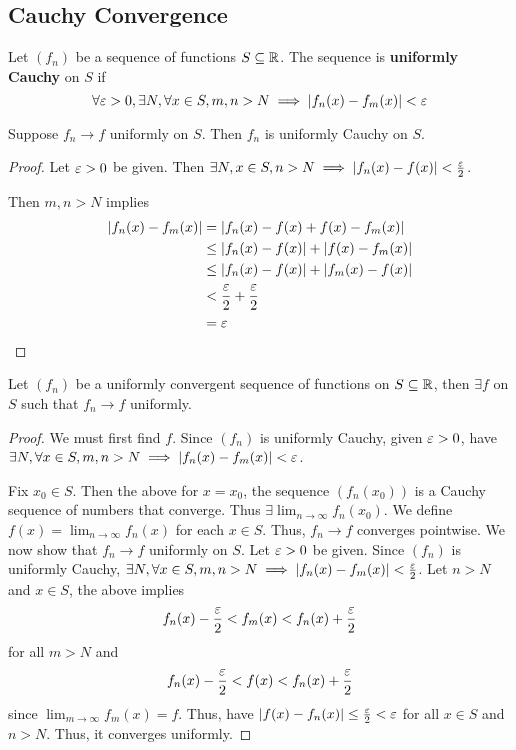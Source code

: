 \documentclass{article}
\begin{document}
\subsection{Cauchy Convergence}
\begin{definition}
  Let $(f_n)$ be a sequence of functions $S \subseteq \mathbb{R}$. The sequence is \textbf{uniformly Cauchy} on $S$ if \[
    \forall \varepsilon > 0, \exists N, \forall x \in S, m, n > N \implies \abs{f_n(x) - f_m(x)} < \varepsilon
  \]
\end{definition}
\begin{theorem}
  Suppose $f_n \to f$ uniformly on $S$. Then $f_n$ is uniformly Cauchy on $S$.
\end{theorem}
\begin{proof}
  Let $\varepsilon > 0$ be given. Then $\exists N, x \in S, n > N \implies \abs{f_n(x) - f(x)} < \frac{\varepsilon}{2}$.

  Then $m, n > N$ implies
  \begin{align*}
    \abs{f_n(x) - f_m(x)} &= \abs{f_n(x) - f(x) + f(x) - f_m(x)}\\
    &\leq \abs{f_n(x) - f(x)} + \abs{f(x) - f_m(x)}\\
    &\leq \abs{f_n(x) - f(x)} + \abs{f_m(x) - f(x)}\\
    &< \frac{\varepsilon}{2} + \frac{\varepsilon}{2}\\
    &= \varepsilon
  \end{align*}
\end{proof}
\begin{cthm}[Theorem 25.4]
  Let $(f_n)$ be a uniformly convergent sequence of functions on $S \subseteq \mathbb{R}$, then $\exists f$ on $S$ such that $f_n \to f$ uniformly.
\end{cthm}
\begin{proof}
  We must first find $f$. Since $(f_n)$ is uniformly Cauchy, given $\varepsilon > 0$, have $\exists N, \forall x \in S, m, n > N \implies \abs{f_n(x) - f_m(x)} < \varepsilon$.

  Fix $x_0 \in S$. Then the above for $x = x_0$, the sequence $(f_n(x_0))$ is a Cauchy sequence of numbers that converge. Thus $\exists \lim_{n\to\infty} f_n(x_0)$. We define $f(x) = \lim_{n\to\infty} f_n(x)$ for each $x \in S$. Thus, $f_n \to f$ converges pointwise. We now show that $f_n \to f$ uniformly on $S$. Let $\varepsilon > 0$ be given. Since $(f_n)$ is uniformly Cauchy, $\exists N, \forall x \in S, m, n > N \implies \abs{f_n(x) - f_m(x)} < \frac{\varepsilon}{2}$. Let $n > N$ and $x \in S$, the above implies \[
    f_n(x) - \frac{\varepsilon}{2} < f_m(x) < f_n(x) + \frac{\varepsilon}{2}
  \] for all $m > N$ and \[
    f_n(x) - \frac{\varepsilon}{2} < f(x) < f_n(x) + \frac{\varepsilon}{2}
  \] since $\lim_{m\to\infty} f_m(x) = f$.
  Thus, have $\abs{f(x) - f_n(x)} \leq \frac{\varepsilon}{2} < \varepsilon$ for all $x \in S$ and $n > N$. Thus, it converges uniformly.
\end{proof}
\end{document}

